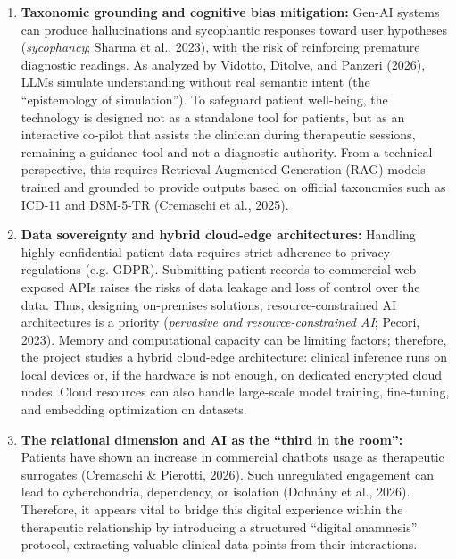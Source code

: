 \documentclass[11pt,a4paper]{article}
\begin{document}
\begin{enumerate}[label=\alph*)]
    \item \textbf{Taxonomic grounding and cognitive bias mitigation:} Gen-AI systems can produce hallucinations and sycophantic responses toward user hypotheses (\textit{sycophancy}; Sharma et al., 2023), with the risk of reinforcing premature diagnostic readings. As analyzed by Vidotto, Ditolve, and Panzeri (2026), LLMs simulate understanding without real semantic intent (the ``epistemology of simulation''). To safeguard patient well-being, the technology is designed not as a standalone tool for patients, but as an interactive co-pilot that assists the clinician during therapeutic sessions, remaining a guidance tool and not a diagnostic authority. From a technical perspective, this requires Retrieval-Augmented Generation (RAG) models trained and grounded to provide outputs based on official taxonomies such as ICD-11 and DSM-5-TR (Cremaschi et al., 2025).
    
    \item \textbf{Data sovereignty and hybrid cloud-edge architectures:} Handling highly confidential patient data requires strict adherence to privacy regulations (e.g. GDPR). Submitting patient records to commercial web-exposed APIs raises the risks of data leakage and loss of control over the data. Thus, designing on-premises solutions, resource-constrained AI architectures is a priority (\textit{pervasive and resource-constrained AI}; Pecori, 2023). Memory and computational capacity can be limiting factors; therefore, the project studies a hybrid cloud-edge architecture: clinical inference runs on local devices or, if the hardware is not enough, on dedicated encrypted cloud nodes. Cloud resources can also handle large-scale model training, fine-tuning, and embedding optimization on datasets.
    
    \item \textbf{The relational dimension and AI as the ``third in the room'':} Patients have shown an increase in commercial chatbots usage as therapeutic surrogates (Cremaschi \& Pierotti, 2026). Such unregulated engagement can lead to cyberchondria, dependency, or isolation (Dohnány et al., 2026). Therefore, it appears vital to bridge this digital experience within the therapeutic relationship by introducing a structured ``digital anamnesis'' protocol, extracting valuable clinical data points from their interactions.
\end{enumerate}

\end{document}
